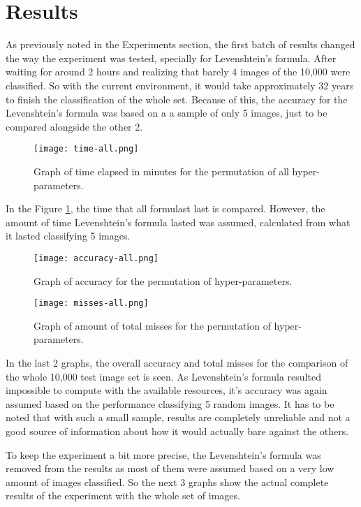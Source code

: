 \documentclass[conference,compsoc]{IEEEtran}
\begin{document}
\section{Results} \label{sec:results}
As previously noted in the Experiments section, the first batch of results changed the way the experiment was tested, specially for Levenshtein's formula. After waiting for around 2 hours and realizing that barely 4 images of the 10,000 were classified. So with the current environment, it would take approximately 32 years to finish the classification of the whole set. Because of this, the accuracy for the Levenshtein's formula was based on a a sample of only 5 images, just to be compared alongside the other 2.

\begin{figure}[H]
\texttt{[image: time-all.png]}
\caption{Graph of time elapsed in minutes for the permutation of all hyper-parameters.}
\label{fig:time-all}
\centering
\end{figure}

In the Figure \ref{fig:time-all}, the time that all formulast last is compared. However, the amount of time Levenshtein's formula lasted was assumed, calculated from what it lasted classifying 5 images.

\begin{figure}[H]
\texttt{[image: accuracy-all.png]}
\caption{Graph of accuracy for the permutation of hyper-parameters.}
\label{fig:accuracy-all}
\centering
\end{figure}

\begin{figure}[H]
\texttt{[image: misses-all.png]}
\caption{Graph of amount of total misses for the permutation of hyper-parameters.}
\label{fig:misses-all}
\centering
\end{figure}

In the last 2 graphs, the overall accuracy and total misses for the comparison of the whole 10,000 test image set is seen. As Levenshtein's formula resulted impossible to compute with the available resources, it's accuracy was again assumed based on the performance classifying 5 random images. It has to be noted that with such a small sample, results are completely unreliable and not a good source of information about how it would actually bare against the others.

To keep the experiment a bit more precise, the Levenshtein's formula was removed from the results as most of them were assumed based on a very low amount of images classified. So the next 3 graphs show the actual complete results of the experiment with the whole set of images.
\end{document}
